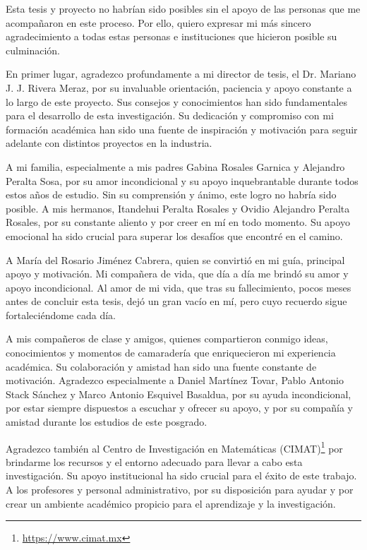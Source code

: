 
Esta tesis y proyecto no habrían sido posibles sin el apoyo de las personas que me acompañaron en
este proceso. Por ello, quiero expresar mi más sincero agradecimiento a todas estas personas e
instituciones que hicieron posible su culminación.

En primer lugar, agradezco profundamente a mi director de tesis, el Dr. Mariano J. J. Rivera Meraz,
por su invaluable orientación, paciencia y apoyo constante a lo largo de este proyecto. Sus consejos
y conocimientos han sido fundamentales para el desarrollo de esta investigación. Su dedicación y
compromiso con mi formación académica han sido una fuente de inspiración y motivación para seguir
adelante con distintos proyectos en la industria.

A mi familia, especialmente a mis padres Gabina Rosales Garnica y Alejandro Peralta Sosa,
por su amor incondicional y su apoyo inquebrantable durante todos estos años de estudio.
Sin su comprensión y ánimo, este logro no habría sido posible. A mis hermanos, Itandehui Peralta
Rosales y Ovidio Alejandro Peralta Rosales, por su constante aliento y por creer en mí en todo
momento. Su apoyo emocional ha sido crucial para superar los desafíos que encontré en el camino.

A María del Rosario Jiménez Cabrera, quien se convirtió en mi guía, principal apoyo y motivación.
Mi compañera de vida, que día a día me brindó su amor y apoyo incondicional. Al amor de mi vida,
que tras su fallecimiento, pocos meses antes de concluir esta tesis, dejó un gran vacío en mí,
pero cuyo recuerdo sigue fortaleciéndome cada día.

A mis compañeros de clase y amigos, quienes compartieron conmigo ideas, conocimientos y momentos
de camaradería que enriquecieron mi experiencia académica. Su colaboración y amistad han sido una
fuente constante de motivación. Agradezco especialmente a Daniel Martínez Tovar, Pablo Antonio
Stack Sánchez y Marco Antonio Esquivel Basaldua, por su ayuda incondicional, por estar siempre
dispuestos a escuchar y ofrecer su apoyo, y por su compañía y amistad durante los estudios de este
posgrado.

Agradezco también al Centro de Investigación en Matemáticas (CIMAT)\footnote{\url{https://www.cimat.mx}} por brindarme los recursos y el entorno
adecuado para llevar a cabo esta investigación. Su apoyo institucional ha sido crucial para el éxito
de este trabajo. A los profesores y personal administrativo, por su disposición para ayudar y por
crear un ambiente académico propicio para el aprendizaje y la investigación.

